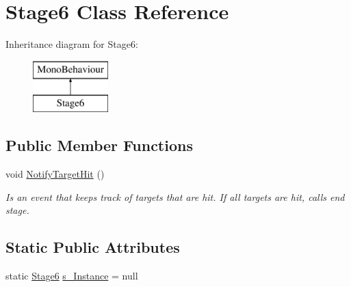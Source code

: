 \hypertarget{class_stage6}{}\section{Stage6 Class Reference}
\label{class_stage6}
Inheritance diagram for Stage6\+:\begin{figure}[H]
\begin{center}
\leavevmode
\includegraphics[height=2.000000cm]{class_stage6}
\end{center}
\end{figure}
\subsection*{Public Member Functions}
\begin{DoxyCompactItemize}
\item 
void \mbox{\hyperlink{class_stage6_a4c5fdae8e6d256d005e1ce12e313274c}{Notify\+Target\+Hit}} ()
\begin{DoxyCompactList}\small\item\em Is an event that keeps track of targets that are hit. If all targets are hit, calls end stage. \end{DoxyCompactList}\end{DoxyCompactItemize}
\subsection*{Static Public Attributes}
\begin{DoxyCompactItemize}
\item 
static \mbox{\hyperlink{class_stage6}{Stage6}} \mbox{\hyperlink{class_stage6_a4cf6e74a5141662ead48cd8099da2c08}{s\+\_\+\+Instance}} = null
\end{DoxyCompactItemize}
